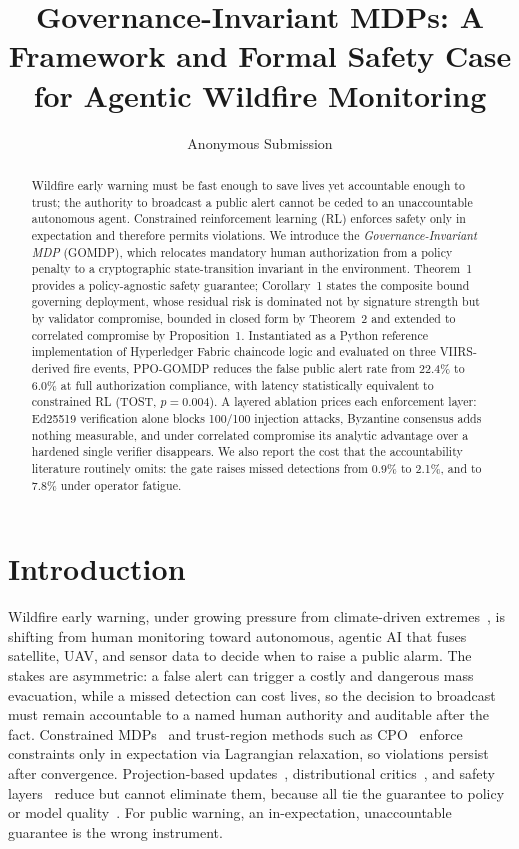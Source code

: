 \documentclass[letterpaper]{article} %
\title{Governance-Invariant MDPs: A Framework and Formal Safety Case for Agentic Wildfire Monitoring}
\author{Anonymous Submission}
\begin{document}
\maketitle

\begin{abstract}
Wildfire early warning must be fast enough to save lives yet accountable enough to trust; the authority to broadcast a public alert cannot be ceded to an unaccountable autonomous agent. Constrained reinforcement learning (RL) enforces safety only in expectation and therefore permits violations. We introduce the \emph{Governance-Invariant MDP} (GOMDP), which relocates mandatory human authorization from a policy penalty to a cryptographic state-transition invariant in the environment. Theorem~1 provides a policy-agnostic safety guarantee; Corollary~1 states the composite bound governing deployment, whose residual risk is dominated not by signature strength but by validator compromise, bounded in closed form by Theorem~2 and extended to correlated compromise by Proposition~1. Instantiated as a Python reference implementation of Hyperledger Fabric chaincode logic and evaluated on three VIIRS-derived fire events, PPO-GOMDP reduces the false public alert rate from 22.4\% to 6.0\% at full authorization compliance, with latency statistically equivalent to constrained RL (TOST, $p=0.004$). A layered ablation prices each enforcement layer: Ed25519 verification alone blocks 100/100 injection attacks, Byzantine consensus adds nothing measurable, and under correlated compromise its analytic advantage over a hardened single verifier disappears. We also report the cost that the accountability literature routinely omits: the gate raises missed detections from 0.9\% to 2.1\%, and to 7.8\% under operator fatigue.
\end{abstract}

\section{Introduction}
\label{sec:intro}

Wildfire early warning, under growing pressure from climate-driven extremes~\citep{divirgilio2019}, is shifting from human monitoring toward autonomous, agentic AI that fuses satellite, UAV, and sensor data to decide when to raise a public alarm. The stakes are asymmetric: a false alert can trigger a costly and dangerous mass evacuation, while a missed detection can cost lives, so the decision to broadcast must remain accountable to a named human authority and auditable after the fact. Constrained MDPs~\citep{altman1999} and trust-region methods such as CPO~\citep{achiam2017} enforce constraints only in expectation via Lagrangian relaxation, so violations persist after convergence. Projection-based updates~\citep{yang2020pcpo}, distributional critics~\citep{yang2021wcsac}, and safety layers~\citep{dalal2018} reduce but cannot eliminate them, because all tie the guarantee to policy or model quality~\citep{gu2022survey}. For public warning, an in-expectation, unaccountable guarantee is the wrong instrument.
\end{document}
